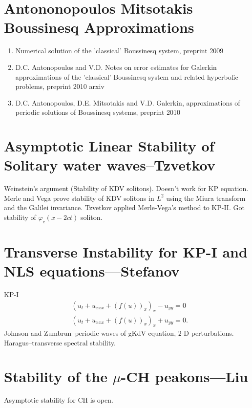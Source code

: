 \documentclass[12pt,reqno]{amsart}
\numberwithin{equation}{section}  %
\newcommand{\vp}{\varphi}
\begin{document}
\section{Antononopoulos Mitsotakis Boussinesq Approximations}
        \begin{enumerate}
          \item Numerical solution of the 'classical' Boussinesq system,
            preprint 2009
          \item D.C. Antonopoulos and V.D. Notes on error estimates for Galerkin
            approximations of the 'classical' Boussinesq system and related
            hyperbolic problems, preprint 2010 arxiv
          \item D.C. Antonopoulos, D.E. Mitsotakis and V.D. Galerkin, approximations of
            periodic solutions of Boussinesq systems, preprint 2010
        \end{enumerate}
        \section{Asymptotic Linear Stability of Solitary water waves--Tzvetkov}
        Weinstein's argument (Stability of KDV solitons). Doesn't work for KP
        equation. Merle and Vega prove stability of KDV solitons in
        $L^{2}$ using the Miura transform and the Galilei invariance. Tzvetkov
        applied Merle-Vega's method to KP-II. Got stability of $\vp_{c}(x - 2ct)$
        soliton.
        \section{Transverse Instability for KP-I and NLS equations---Stefanov}
       KP-I
       \begin{equation*}
       \begin{split}
         & (u_{t} + u_{xxx} + (f(u))_{x})_{x} - u_{yy} =0
         \\
         & (u_{t} + u_{xxx} + (f(u))_{x})_{x} + u_{yy} = 0.
       \end{split}
       \end{equation*}
       Johnson and Zumbrun--periodic waves of gKdV equation, 2-D perturbations.
       Haragus--transverse spectral stability.
       \section{Stability of the $\mu$-CH peakons---Liu}
       Asymptotic stability for CH is open.
\end{document}
